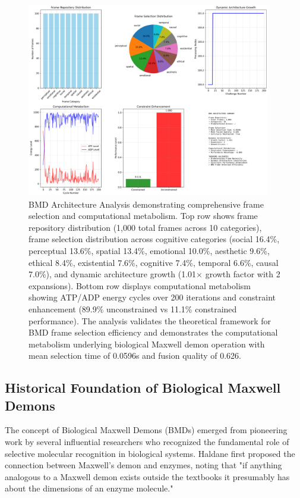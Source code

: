 \documentclass[12pt,a4paper]{article}
\begin{document}
\begin{figure}[htbp]
    \centering
    \includegraphics[width=0.95\textwidth]{images/bmd_architecture_analysis_20250925_230459.png}
    \caption{BMD Architecture Analysis demonstrating comprehensive frame selection and computational metabolism. Top row shows frame repository distribution (1,000 total frames across 10 categories), frame selection distribution across cognitive categories (social 16.4\%, perceptual 13.6\%, spatial 13.4\%, emotional 10.0\%, aesthetic 9.6\%, ethical 8.4\%, existential 7.6\%, cognitive 7.4\%, temporal 6.6\%, causal 7.0\%), and dynamic architecture growth (1.01$\times$ growth factor with 2 expansions). Bottom row displays computational metabolism showing ATP/ADP energy cycles over 200 iterations and constraint enhancement (89.9\% unconstrained vs 11.1\% constrained performance). The analysis validates the theoretical framework for BMD frame selection efficiency and demonstrates the computational metabolism underlying biological Maxwell demon operation with mean selection time of 0.0596s and fusion quality of 0.626.}
    \label{fig:bmd_architecture}
    \end{figure}

\subsection{Historical Foundation of Biological Maxwell Demons}

The concept of Biological Maxwell Demons (BMDs) emerged from pioneering work by several influential researchers who recognized the fundamental role of selective molecular recognition in biological systems. Haldane \citep{haldane1930} first proposed the connection between Maxwell's demon and enzymes, noting that "if anything analogous to a Maxwell demon exists outside the textbooks it presumably has about the dimensions of an enzyme molecule."
\end{document}
